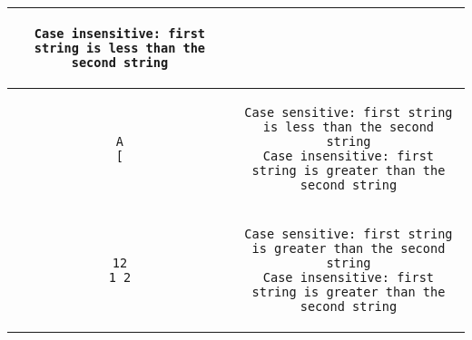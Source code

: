 \documentclass[a4paper]{scrartcl}
\theoremstyle{definition}
\begin{document}
\begin{center}
\begin{tabular}{c|c}
\begin{minipage}{33.7em}
\begin{verbatim}
Case insensitive: first string is less than the second string
\end{verbatim}
\end{minipage}\\
\hline
\begin{minipage}{.9\textwidth-33.7em}
\begin{verbatim}
A
[
\end{verbatim}
\end{minipage}&
\begin{minipage}{33.7em}
\begin{verbatim}
Case sensitive: first string is less than the second string
Case insensitive: first string is greater than the second string
\end{verbatim}
\end{minipage}\\
\hline
\begin{minipage}{.9\textwidth-33.7em}
\begin{verbatim}
12
1 2
\end{verbatim}
\end{minipage}&
\begin{minipage}{33.7em}
\begin{verbatim}
Case sensitive: first string is greater than the second string
Case insensitive: first string is greater than the second string
\end{verbatim}
\end{minipage}
\end{tabular}
\end{center}
\end{document}
